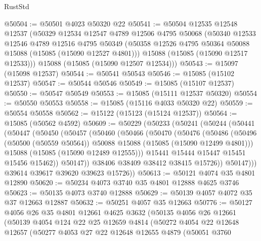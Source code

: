 \begin{lexlean}{RustStd}
\begin{coremodule}
@50504 := @50501 @4023 @50320 @22
@50541 := @50504
    @12535
    @12548
    @12537
    (@50329
      @12534
      @12547
      @4789
      @12506
      @4795
      @50068
      (@50340
        @12533
        @12546
        @4789
        @12516
        @4795
        @50349
        (@50358 @12526 @4795 @50364 @50088 @15088 (@15085 (@15090 @12527 @4801)))
        @15088
        (@15085 (@15090 @12517 @12533)))
      @15088
      (@15085 (@15090 @12507 @12534)))
@50543 := @15097 (@15098 @12537)
@50544 := @50541 @50543
@50546 := @15085 (@15102 @12537)
@50547 := @50544 @50546
@50549 := @15085 (@15107 @12537)
@50550 := @50547 @50549
@50553 := @15085 (@15111 @12537 @50320)
@50554 := @50550 @50553
@50558 := @15085 (@15116 @4033 @50320 @22)
@50559 := @50554 @50558
@50562 := @15122 (@15123 (@15124 @12537))
@50564 := @15085 (@50562 @4592)
@50609 := @50229
    (@50233
      (@50241
        (@50244
          (@50441
            (@50447
              (@50450
                (@50457
                  (@50460
                    (@50466
                      (@50470
                        (@50476
                          (@50486
                            (@50496
                              (@50500 (@50559 @50564))
                              @50088
                              @15088
                              (@15085 (@15090 @12499 @4801)))
                            @15088
                            (@15085 (@15090 @12489 @12555)))
                          @15441
                          @15444
                          @15447
                          @15451
                          @15456
                          @15462))
                      @50147))
                  @38406
                  @38409
                  @38412
                  @38415
                  @15726))
              @50147)))
        @39614
        @39617
        @39620
        @39623
        @15726))
@50613 := @50121 @4074 @35 @4801 @12890
@50620 := @50234 @4073 @3740 @35 @4801 @12888 @4625 @3746
@50623 := @50135 @4073 @3740 @12888
@50629 := @50139 @4057 @4072 @35 @37 @12663 @12887
@50632 := @50251 @4057 @35 @12663
@50776 := @50127
    @4056
    @26
    @35
    @4801
    @12661
    @4625
    @3632
    (@50135
      @4056
      @26
      @12661
      (@50139
        @4054
        @124
        @22
        @25
        @12659
        @4814
        (@50272
          @4054
          @22
          @12648
          @12657
          (@50277
            @4053
            @27
            @22
            @12648
            @12655
            @4879
            (@50051
              @3760

\end{coremodule}
\end{lexlean}
